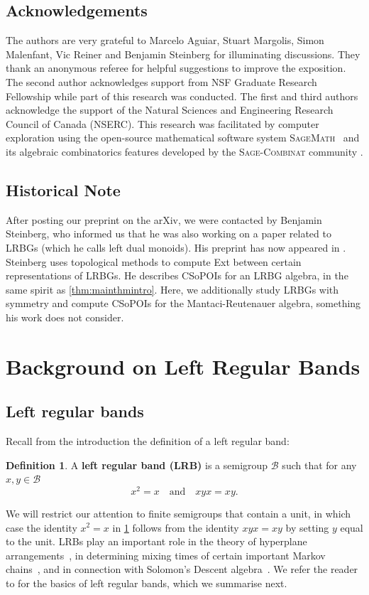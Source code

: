 \documentclass[11pt, oneside, reqno]{amsart}
\theoremstyle{definition}
\newtheorem{definition}[theorem]{Definition}
\numberwithin{equation}{section}
\newcommand{\defn}[1]{{\color{RoyalBlue}\bf#1}}
\def \BB{{\mathcal{B}}}
\begin{document}
\subsection*{Acknowledgements}
The authors are very grateful to Marcelo Aguiar, Stuart Margolis, Simon Malenfant, Vic Reiner and Benjamin Steinberg for illuminating discussions. They thank an anonymous referee for helpful suggestions to improve the exposition. The second author acknowledges support from NSF Graduate Research Fellowship while part of this research was conducted.
The first and third authors acknowledge the support of the Natural Sciences and Engineering Research Council of Canada (NSERC).
This research was facilitated by computer exploration using the open-source
mathematical software system \textsc{SageMath}~\cite{SageMath} and its algebraic
combinatorics features developed by the \textsc{Sage-Combinat} community 
\cite{sage-combinat}. 

\subsection*{Historical Note}
After posting our preprint on the arXiv, we were contacted by Benjamin Steinberg, who informed us that he was also working on a paper related to LRBGs (which he calls left dual monoids).
His preprint has now appeared in \cite{steinberg23topology}. Steinberg uses topological methods to compute Ext between certain representations of LRBGs. He describes CSoPOIs for an LRBG algebra, in the same spirit as \cref{thm:mainthmintro}. Here, we additionally study LRBGs with symmetry and compute CSoPOIs for the Mantaci-Reutenauer algebra, something his work does not consider.
\section{Background on Left Regular Bands}\label{sec:backgroundLRB}

\subsection{Left regular bands}
Recall from the introduction the definition of a left regular band:
\begin{definition}\label{def:lrb}
    A \defn{left regular band (LRB)} is a semigroup $\BB$ such that for any $x,y \in \BB$
    \begin{equation*}
        x^2 = x
        \quad\text{and}\quad
        xyx = xy.
    \end{equation*}
\end{definition}
We will restrict our attention to finite semigroups that contain a unit, in which case
the identity $x^2 = x$ in \cref{def:lrb} follows from the identity $xyx = xy$ by setting $y$ equal to the unit.
LRBs play an important role in the theory of hyperplane arrangements~\cite{am17}, in determining mixing times of certain important Markov chains~\cite{BHR}, and in connection with Solomon's Descent algebra~\cite{bidigare}.
We refer the reader to \cite[Appendix B]{BrownOnLRBs} for the basics of left regular bands, which we summarise next.
\end{document}
